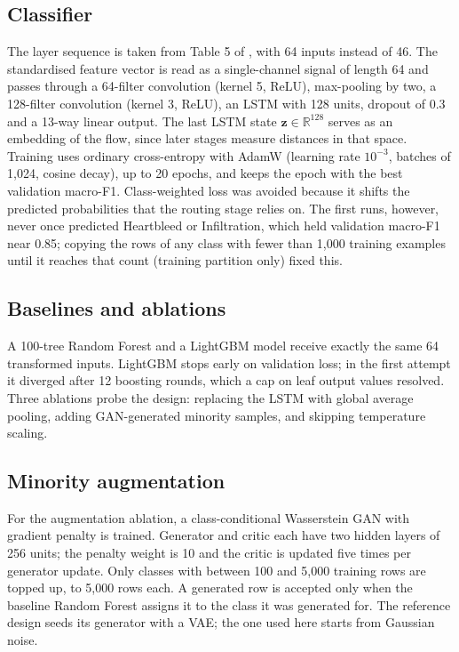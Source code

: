 \documentclass[conference]{IEEEtran}
\begin{document}
\subsection{Classifier}
The layer sequence is taken from Table 5 of \cite{refpaper2025}, with 64 inputs instead of 46.
The standardised feature vector is read as a single-channel signal of length 64 and passes through
a 64-filter convolution (kernel 5, ReLU), max-pooling by two, a 128-filter convolution (kernel 3,
ReLU), an LSTM with 128 units, dropout of 0.3 and a 13-way linear output. The last LSTM
state $\mathbf{z}\in\mathbb{R}^{128}$ serves as an embedding of the flow, since later stages measure
distances in that space. Training uses ordinary cross-entropy with AdamW (learning rate
$10^{-3}$, batches of 1,024, cosine decay), up to 20 epochs, and keeps the epoch with the best
validation macro-F1. Class-weighted loss was avoided because it shifts the predicted probabilities
that the routing stage relies on. The first runs, however, never once predicted Heartbleed or
Infiltration, which held validation macro-F1 near 0.85; copying the rows of any class with fewer
than 1,000 training examples until it reaches that count (training partition only) fixed this.

\subsection{Baselines and ablations}
A 100-tree Random Forest and a LightGBM model receive exactly the same 64 transformed inputs.
LightGBM stops early on validation loss; in the first attempt it diverged after 12 boosting
rounds, which a cap on leaf output values resolved. Three ablations probe the design: replacing
the LSTM with global average pooling, adding GAN-generated minority samples, and skipping
temperature scaling.

\subsection{Minority augmentation}
For the augmentation ablation, a class-conditional Wasserstein GAN with gradient penalty
\cite{mirza2014conditional,gulrajani2017improved} is trained. Generator and critic each have two hidden layers
of 256 units; the penalty weight is 10 and the critic is updated five times per generator update.
Only classes with between 100 and 5,000 training rows are topped up, to 5,000 rows each. A
generated row is accepted only when the baseline Random Forest assigns it to the class it was
generated for. The reference design seeds its generator with a VAE; the one used here starts from Gaussian
noise.
\end{document}
